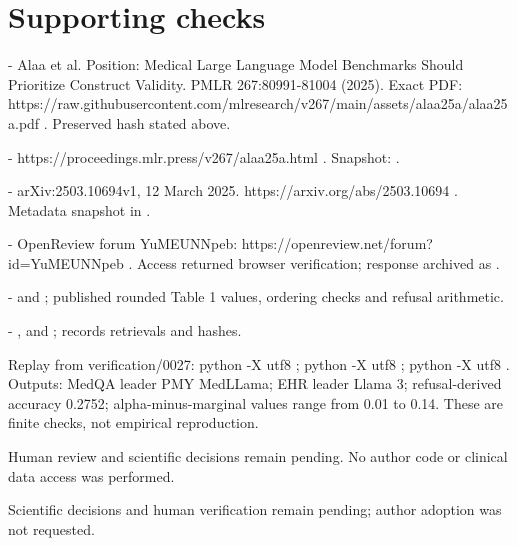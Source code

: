 \documentclass[10pt]{article}
\begin{document}
\section*{Supporting checks}
- Alaa et al. Position: Medical Large Language Model Benchmarks Should Prioritize Construct Validity. PMLR 267:80991-81004 (2025). Exact PDF: https://raw.githubusercontent.com/mlresearch/v267/main/assets/alaa25a/alaa25a.pdf . Preserved hash stated above.\par
- https://proceedings.mlr.press/v267/alaa25a.html . Snapshot: .\par
- arXiv:2503.10694v1, 12 March 2025. https://arxiv.org/abs/2503.10694 . Metadata snapshot in .\par
- OpenReview forum YuMEUNNpeb: https://openreview.net/forum?id=YuMEUNNpeb . Access returned browser verification; response archived as .\par
- and ; published rounded Table 1 values, ordering checks and refusal arithmetic.\par
- , and ; records retrievals and hashes.\par
Replay from verification/0027: python -X utf8 ; python -X utf8 ; python -X utf8 . Outputs: MedQA leader PMY MedLLama; EHR leader Llama 3; refusal-derived accuracy 0.2752; alpha-minus-marginal values range from 0.01 to 0.14. These are finite checks, not empirical reproduction.\par
Human review and scientific decisions remain pending. No author code or clinical data access was performed.\par
Scientific decisions and human verification remain pending; author adoption was not requested.\par
\end{document}
